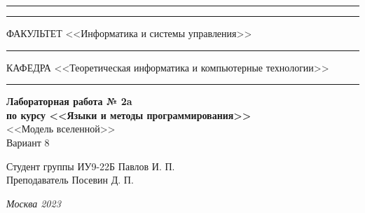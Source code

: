 \documentclass[a4paper, 14pt]{extarticle}
\begin{document}
\begin{titlepage}
\vspace{-25pt}
\hspace{-35pt}\rule{\textwidth}{2.3pt}

\vspace*{-20.3pt}
\hspace{-35pt}\rule{\textwidth}{0.4pt}

\vspace{1.5ex}
\hspace{-35pt} \noindent \small ФАКУЛЬТЕТ\hspace{80pt} <<Информатика и системы управления>>

\vspace*{-16pt}
\hspace{47pt}\rule{0.83\textwidth}{0.4pt}

\vspace{0.5ex}
\hspace{-35pt} \noindent \small КАФЕДРА\hspace{50pt} <<Теоретическая информатика и компьютерные технологии>>

\vspace*{-16pt}
\hspace{30pt}\rule{0.866\textwidth}{0.4pt}
  
\vspace{11em}

\begin{center}
\Large {\bf Лабораторная работа № 2a} \\ 
\large {\bf по курсу <<Языки и методы программирования>>} \\
\large <<Модель вселенной>> \\
\large Вариант 8
\end{center}\normalsize

\vspace{8em}


\begin{flushright}
  {Студент группы ИУ9-22Б Павлов И. П. \hspace*{15pt}\\ 
  \vspace{2ex}
  Преподаватель Посевин Д. П.\hspace*{15pt}}
\end{flushright}

\bigskip

\vfill
 

\begin{center}
\textsl{Москва 2023}
\end{center}
\end{titlepage}
\end{document}
